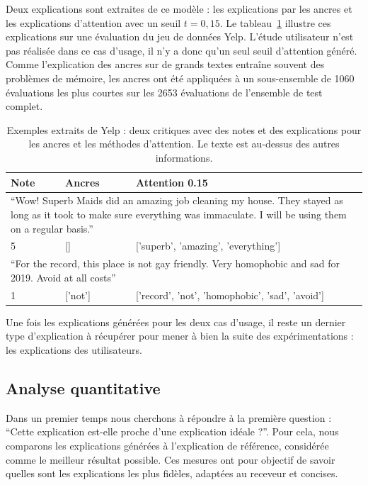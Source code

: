 Deux explications sont extraites de ce modèle : les explications par les ancres et les explications d'attention avec un seuil $t=0,15$. Le tableau~\ref{exemple_yelp} illustre ces explications sur une évaluation du jeu de données Yelp. L'étude utilisateur n'est pas réalisée dans ce cas d'usage, il n'y a donc qu'un seul seuil d'attention généré. Comme l'explication des ancres sur de grands textes entraîne souvent des problèmes de mémoire, les ancres ont été appliquées à un sous-ensemble de 1060 évaluations les plus courtes sur les 2653 évaluations de l'ensemble de test complet.

\begin{table}[h!tpb]
\caption{Exemples extraits de Yelp : deux critiques avec des notes et des explications pour les ancres et les méthodes d'attention. Le texte est au-dessus des autres informations.}\label{exemple_yelp}
\begin{tabular}{|p{}|p{}|l|}
\cline{1-3}
\textbf{Note} & \textbf{Ancres} & \textbf{Attention 0.15} \\ \hline
\multicolumn{3}{|p{0.95\textwidth}|}{``Wow! Superb Maids did an amazing job cleaning my house. They stayed as long as it took to make sure everything was immaculate. I will be using them on a regular basis.''}\\ \hline
5 & {[}{]} &  ['superb', 'amazing', 'everything'] \\ \cline{1-3}
\multicolumn{3}{|p{0.95\textwidth}|}{``For the record, this place is not gay friendly. Very homophobic and sad for 2019. Avoid at all costs''} \\ \hline
1 & ['not'] & ['record', 'not', 'homophobic', 'sad', 'avoid'] \\ \cline{1-3}
\end{tabular}
\end{table}

Une fois les explications générées pour les deux cas d'usage, il reste un dernier type d'explication à récupérer pour mener à bien la suite des expérimentations : les explications des utilisateurs.

\subsection{Analyse quantitative} \label{C3:qt_metric}

Dans un premier temps nous cherchons à répondre à la première question : ``Cette explication est-elle proche d'une explication idéale ?''.
Pour cela, nous comparons les explications générées à l'explication de référence,  considérée comme le meilleur résultat possible.
Ces mesures ont pour objectif de savoir quelles sont les explications les plus fidèles, adaptées au receveur et concises.

